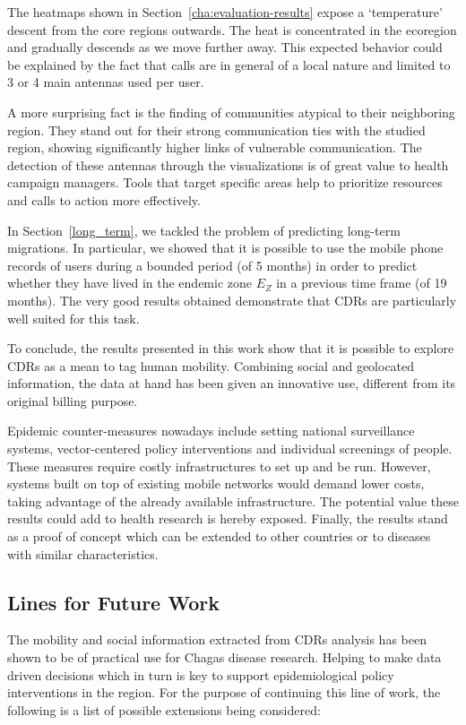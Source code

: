 The heatmaps shown in Section~\cref{cha:evaluation-results} expose a `temperature' descent from the core regions outwards. The heat is concentrated in the ecoregion and gradually descends as we move further away. This expected behavior could be explained by the fact that calls are in general of a local nature and limited to 3 or 4 main antennas used per user.

A more surprising fact is the finding of communities atypical to their neighboring region. They stand out for their strong communication ties with the studied region, showing significantly higher links of vulnerable communication. The detection of these antennas through the visualizations is of great value to health campaign managers. Tools that target specific areas help to prioritize resources and calls to action more effectively.

In Section~\cref{long_term}, we tackled the problem of predicting long-term migrations. In particular, we showed that it is possible to use the mobile phone records of users during a bounded period (of 5 months) in order to predict whether they have lived in the endemic zone $E_Z$ in a previous time frame (of 19 months).
The very good results obtained demonstrate that CDRs are particularly well suited for this task.

To conclude, the results presented in this work show that it is possible to explore CDRs as a mean to tag human mobility. Combining social and geolocated information, the data at hand has been given an innovative use, different from its original billing purpose.

Epidemic counter-measures nowadays include setting national surveillance systems, vector-centered policy interventions and individual screenings of people. These measures require costly infrastructures to set up and be run. However, systems built on top of existing mobile networks would demand lower costs, taking advantage of the already available infrastructure. The potential value these results could add to health research is hereby exposed.
Finally, the results stand as a proof of concept which can be extended to other countries or to diseases with similar characteristics.



\subsection{Lines for Future Work}

The mobility and social information extracted from CDRs analysis has been shown to be of practical use for Chagas disease research. Helping to make data driven decisions which in turn is key to support epidemiological policy interventions in the region. For the purpose of continuing this line of work, the following is a list of possible extensions being considered:


